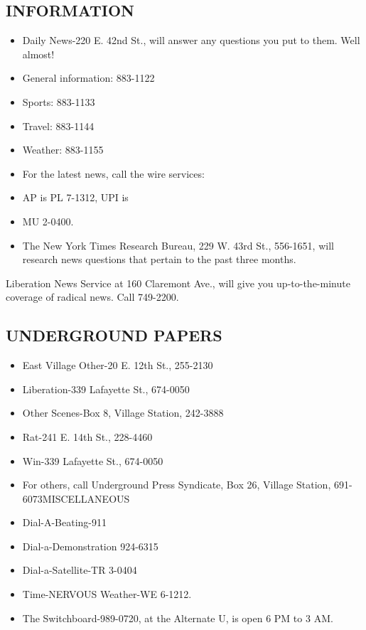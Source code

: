 \documentclass[11pt,twoside,a4paper]{book}
\begin{document}
\subsection{INFORMATION}
\begin{itemize}
\item Daily News-220 E. 42nd St., will answer any questions you put to them. Well almost!         
\item General information: 883-1122     
\item Sports: 883-1133     
\item Travel: 883-1144     
\item Weather: 883-1155     
\item For the latest news, call the wire services:         
\item AP is PL 7-1312, UPI is      
\item MU 2-0400.     
\item The New York Times Research Bureau, 229 W. 43rd St., 556-1651, will research news questions that pertain to the past three months. 
\end{itemize}
Liberation News Service at 160 Claremont Ave., will give you up-to-the-minute coverage of radical news. Call 749-2200.~\\

\subsection{UNDERGROUND PAPERS}
\begin{itemize}
\item East Village Other-20 E. 12th St., 255-2130 
\item Liberation-339 Lafayette St., 674-0050 
\item Other Scenes-Box 8, Village Station, 242-3888 
\item Rat-241 E. 14th St., 228-4460 
\item Win-339 Lafayette St., 674-0050 
\item For others, call Underground Press Syndicate, Box 26, Village Station, 691-6073MISCELLANEOUS 
\item Dial-A-Beating-911 
\item Dial-a-Demonstration 924-6315 
\item Dial-a-Satellite-TR 3-0404 
\item Time-NERVOUS Weather-WE 6-1212. 
\item The Switchboard-989-0720, at the Alternate U, is open 6 PM to 3 AM.
\end{itemize}
\end{document}
